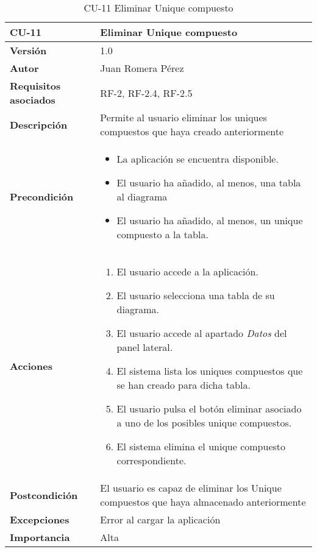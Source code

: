 \begin{table}[p]
    \centering
    \begin{tabularx}{\linewidth}{ p{} p{}}
		\toprule
		\textbf{CU-11}    & \textbf{Eliminar Unique compuesto}\\
		\toprule
		\textbf{Versión}              & 1.0    \\
		\textbf{Autor}                & Juan Romera Pérez \\
		\textbf{Requisitos asociados} & RF-2, RF-2.4, RF-2.5 \\
		\textbf{Descripción}          & Permite al usuario eliminar los uniques compuestos que haya creado anteriormente \\
		\textbf{Precondición}         & \begin{itemize}
		    \item La aplicación se encuentra disponible.
            \item El usuario ha añadido, al menos, una tabla al diagrama
            \item El usuario ha añadido, al menos, un unique compuesto a la tabla.
		\end{itemize} \\
		\textbf{Acciones}             &
		\begin{enumerate}
			\def\labelenumi{\arabic{enumi}.}
			\tightlist
			\item El usuario accede a la aplicación.
			\item El usuario selecciona una tabla de su diagrama.
            \item El usuario accede al apartado \emph{Datos} del panel lateral.
            \item El sistema lista los uniques compuestos que se han creado para dicha tabla.
            \item El usuario pulsa el botón eliminar asociado a uno de los posibles unique compuestos.
            \item El sistema elimina el unique compuesto correspondiente.
		\end{enumerate}\\
		\textbf{Postcondición}        & El usuario es capaz de eliminar los Unique compuestos que haya almacenado anteriormente \\
		\textbf{Excepciones}          & Error al cargar la aplicación \\
		\textbf{Importancia}          & Alta \\
		\bottomrule
    \end{tabularx}
    \caption{CU-11 Eliminar Unique compuesto}
\end{table}

